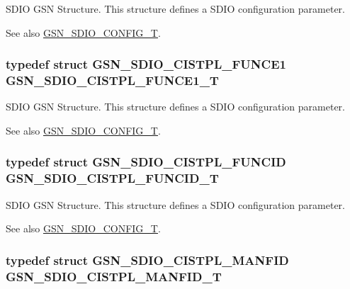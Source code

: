 SDIO GSN Structure. This structure defines a SDIO configuration parameter. 

\begin{DoxySeeAlso}{See also}
\hyperlink{a00653_ga741fda4dc2cd93143a8a73ddaace7de8}{GSN\_\-SDIO\_\-CONFIG\_\-T}. 
\end{DoxySeeAlso}
\hypertarget{a00653_gaad08d4da003d74eb8301281f67bdde39}{
\subsubsection[{GSN\_\-SDIO\_\-CISTPL\_\-FUNCE1\_\-T}]{\setlength{\rightskip}{0pt plus 5cm}typedef struct {\bf GSN\_\-SDIO\_\-CISTPL\_\-FUNCE1} {\bf GSN\_\-SDIO\_\-CISTPL\_\-FUNCE1\_\-T}}}
\label{a00653_gaad08d4da003d74eb8301281f67bdde39}


SDIO GSN Structure. This structure defines a SDIO configuration parameter. 

\begin{DoxySeeAlso}{See also}
\hyperlink{a00653_ga741fda4dc2cd93143a8a73ddaace7de8}{GSN\_\-SDIO\_\-CONFIG\_\-T}. 
\end{DoxySeeAlso}
\hypertarget{a00653_ga6ed752facb495193a30f5e53dfa13490}{
\subsubsection[{GSN\_\-SDIO\_\-CISTPL\_\-FUNCID\_\-T}]{\setlength{\rightskip}{0pt plus 5cm}typedef struct {\bf GSN\_\-SDIO\_\-CISTPL\_\-FUNCID} {\bf GSN\_\-SDIO\_\-CISTPL\_\-FUNCID\_\-T}}}
\label{a00653_ga6ed752facb495193a30f5e53dfa13490}


SDIO GSN Structure. This structure defines a SDIO configuration parameter. 

\begin{DoxySeeAlso}{See also}
\hyperlink{a00653_ga741fda4dc2cd93143a8a73ddaace7de8}{GSN\_\-SDIO\_\-CONFIG\_\-T}. 
\end{DoxySeeAlso}
\hypertarget{a00653_gab74bdd813aab97891c103a24000c5131}{
\subsubsection[{GSN\_\-SDIO\_\-CISTPL\_\-MANFID\_\-T}]{\setlength{\rightskip}{0pt plus 5cm}typedef struct {\bf GSN\_\-SDIO\_\-CISTPL\_\-MANFID} {\bf GSN\_\-SDIO\_\-CISTPL\_\-MANFID\_\-T}}}
\label{a00653_gab74bdd813aab97891c103a24000c5131}


